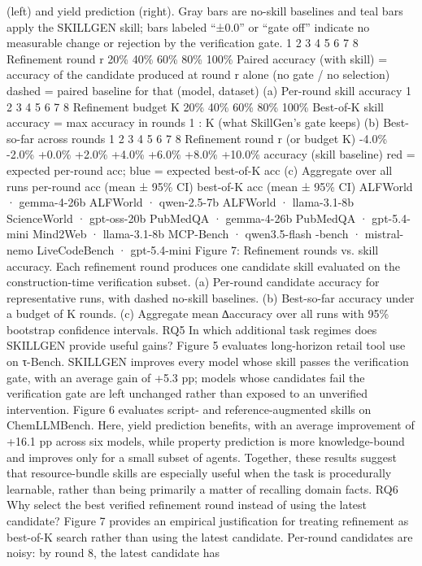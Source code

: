 (left) and yield prediction (right). Gray bars are no-skill baselines and teal bars apply the SKILLGEN
skill; bars labeled “±0.0” or “gate off” indicate no measurable change or rejection by the verification
gate.
1
2
3
4
5
6
7
8
Refinement round  r
20\%
40\%
60\%
80\%
100\%
Paired accuracy (with skill)
= accuracy of the candidate produced at round r alone (no gate / no selection)
dashed = paired baseline
for that (model, dataset)
(a)  Per-round skill accuracy
1
2
3
4
5
6
7
8
Refinement budget  K
20\%
40\%
60\%
80\%
100\%
Best-of-K skill accuracy
= max accuracy in rounds 1 : K  (what SkillGen's gate keeps)
(b)  Best-so-far across rounds
1
2
3
4
5
6
7
8
Refinement round  r (or budget K)
-4.0\%
-2.0\%
+0.0\%
+2.0\%
+4.0\%
+6.0\%
+8.0\%
+10.0\%
 accuracy  (skill  baseline)
red = expected per-round acc;  blue = expected best-of-K acc
(c)  Aggregate over all runs
per-round acc  (mean ± 95\% CI)
best-of-K acc  (mean ± 95\% CI)
ALFWorld · gemma-4-26b
ALFWorld · qwen-2.5-7b
ALFWorld · llama-3.1-8b
ScienceWorld · gpt-oss-20b
PubMedQA · gemma-4-26b
PubMedQA · gpt-5.4-mini
Mind2Web · llama-3.1-8b
MCP-Bench · qwen3.5-flash
-bench · mistral-nemo
LiveCodeBench · gpt-5.4-mini
Figure 7: Refinement rounds vs. skill accuracy. Each refinement round produces one candidate
skill evaluated on the construction-time verification subset. (a) Per-round candidate accuracy for
representative runs, with dashed no-skill baselines. (b) Best-so-far accuracy under a budget of K
rounds. (c) Aggregate mean ∆accuracy over all runs with 95\% bootstrap confidence intervals.
RQ5 In which additional task regimes does SKILLGEN provide useful gains?
Figure 5 evaluates long-horizon retail tool use on τ-Bench. SKILLGEN improves every model whose
skill passes the verification gate, with an average gain of +5.3 pp; models whose candidates fail the
verification gate are left unchanged rather than exposed to an unverified intervention.
Figure 6 evaluates script- and reference-augmented skills on ChemLLMBench. Here, yield prediction
benefits, with an average improvement of +16.1 pp across six models, while property prediction
is more knowledge-bound and improves only for a small subset of agents. Together, these results
suggest that resource-bundle skills are especially useful when the task is procedurally learnable,
rather than being primarily a matter of recalling domain facts.
RQ6 Why select the best verified refinement round instead of using the latest candidate?
Figure 7 provides an empirical justification for treating refinement as best-of-K search rather than
using the latest candidate. Per-round candidates are noisy: by round 8, the latest candidate has
